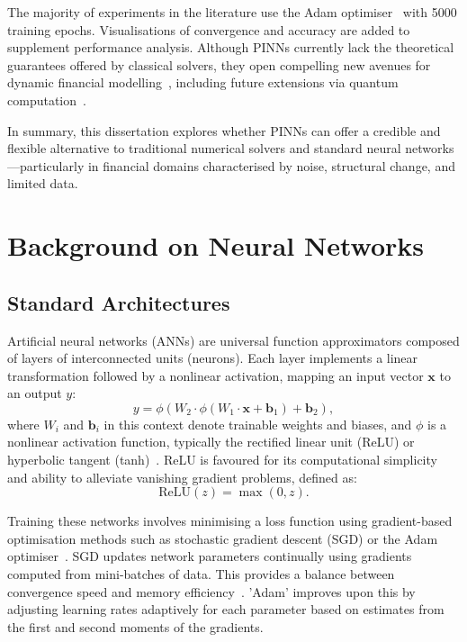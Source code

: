 \documentclass[12pt,a4paper]{article}
\begin{document}
The majority of experiments in the literature use the Adam optimiser~\cite{kingma2014adam} with 5000 training epochs. Visualisations of convergence and accuracy are added to supplement performance analysis. Although PINNs currently lack the theoretical guarantees offered by classical solvers, they open compelling new avenues for dynamic financial modelling~\cite{e2017deep}, including future extensions via quantum computation~\cite{zhang2022quantum}.

In summary, this dissertation explores whether PINNs can offer a credible and flexible alternative to traditional numerical solvers and standard neural networks—particularly in financial domains characterised by noise, structural change, and limited data.


\section{Background on Neural Networks}

\subsection{Standard Architectures}

Artificial neural networks (ANNs) are universal function approximators composed of layers of interconnected units (neurons). Each layer implements a linear transformation followed by a nonlinear activation, mapping an input vector $\mathbf{x}$ to an output $y$:
\begin{equation}
y = \phi(W_2 \cdot \phi(W_1 \cdot \mathbf{x} + \mathbf{b}_1) + \mathbf{b}_2),
\label{eq:ann-forward}
\end{equation}
where \( W_i \) and \( \mathbf{b}_i \) in this context denote trainable weights and biases, and \(\phi\) is a nonlinear activation function, typically the rectified linear unit (ReLU) or hyperbolic tangent (tanh)~\cite{goodfellow2016deep}. ReLU is favoured for its computational simplicity and ability to alleviate vanishing gradient problems, defined as:
\begin{equation}
\text{ReLU}(z) = \max(0, z).
\label{eq:relu}
\end{equation}

Training these networks involves minimising a loss function using gradient-based optimisation methods such as stochastic gradient descent (SGD) or the Adam optimiser~\cite{kingma2014adam}. SGD updates network parameters continually using gradients computed from mini-batches of data. This provides a balance between convergence speed and memory efficiency~\cite{ruder2016overview}. 'Adam' improves upon this by adjusting learning rates adaptively for each parameter based on estimates from the first and second moments of the gradients.
\end{document}

